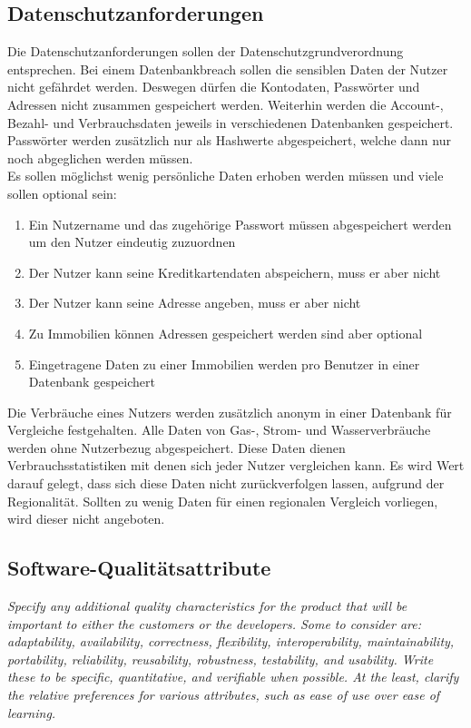 \subsection{Datenschutzanforderungen}
Die Datenschutzanforderungen sollen der Datenschutzgrundverordnung entsprechen. Bei einem Datenbankbreach sollen die sensiblen Daten der Nutzer nicht gefährdet werden. Deswegen dürfen die Kontodaten, Passwörter und Adressen nicht zusammen gespeichert werden. Weiterhin werden die Account-, Bezahl- und Verbrauchsdaten jeweils in verschiedenen Datenbanken gespeichert. Passwörter werden zusätzlich nur als Hashwerte abgespeichert, welche dann nur noch abgeglichen werden müssen.\\
Es sollen möglichst wenig persönliche Daten erhoben werden müssen und viele sollen optional sein:

\begin{enumerate}
    \item Ein Nutzername und das zugehörige Passwort müssen abgespeichert werden um den Nutzer eindeutig zuzuordnen
    \item Der Nutzer kann seine Kreditkartendaten abspeichern, muss er aber nicht
    \item Der Nutzer kann seine Adresse angeben, muss er aber nicht
    \item Zu Immobilien können Adressen gespeichert werden sind aber optional
    \item Eingetragene Daten zu einer Immobilien werden pro Benutzer in einer Datenbank gespeichert
\end{enumerate}
Die Verbräuche eines Nutzers werden zusätzlich anonym in einer Datenbank für Vergleiche festgehalten. Alle Daten von Gas-, Strom- und Wasserverbräuche werden ohne Nutzerbezug abgespeichert. Diese Daten dienen Verbrauchsstatistiken mit denen sich jeder Nutzer vergleichen kann. Es wird Wert darauf gelegt, dass sich diese Daten nicht zurückverfolgen lassen, aufgrund der Regionalität. Sollten zu wenig Daten für einen regionalen Vergleich vorliegen, wird dieser nicht angeboten.

\subsection{Software-Qualitätsattribute}
\textit{Specify any additional quality characteristics for the product that will be important to either the customers or
the developers.
Some to consider are: adaptability, availability, correctness, flexibility, 
interoperability, maintainability, portability, reliability, reusability, 
robustness, testability, and usability. Write these to be specific, quantitative, 
and verifiable when possible.
At the least, clarify the relative preferences for various attributes, 
such as ease of use over ease of learning.}

